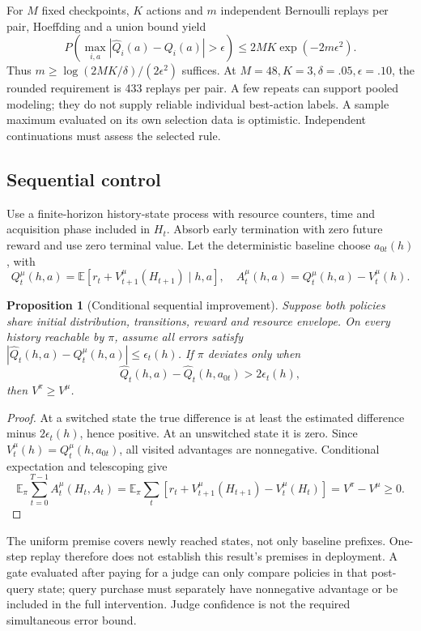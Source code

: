 \documentclass[11pt]{article}
\newtheorem{proposition}{Proposition}
\begin{document}
For $M$ fixed checkpoints, $K$ actions and $m$ independent Bernoulli replays per pair, Hoeffding and a union bound yield
\[
P\!\left(\max_{i,a}|\widehat Q_i(a)-Q_i(a)|>\epsilon\right)
\leq2MK\exp(-2m\epsilon^2).
\]
Thus $m\geq\log(2MK/\delta)/(2\epsilon^2)$ suffices. At $M=48,K=3,\delta=.05,\epsilon=.10$, the rounded requirement is 433 replays per pair. A few repeats can support pooled modeling; they do not supply reliable individual best-action labels. A sample maximum evaluated on its own selection data is optimistic. Independent continuations must assess the selected rule.

\subsection{Sequential control}
Use a finite-horizon history-state process with resource counters, time and acquisition phase included in $H_t$. Absorb early termination with zero future reward and use zero terminal value. Let the deterministic baseline choose $a_{0t}(h)$, with
\[
Q_t^\mu(h,a)=\mathbb E[r_t+V_{t+1}^\mu(H_{t+1})\mid h,a],\quad
A_t^\mu(h,a)=Q_t^\mu(h,a)-V_t^\mu(h).
\]
\begin{proposition}[Conditional sequential improvement]
Suppose both policies share initial distribution, transitions, reward and resource envelope. On every history reachable by $\pi$, assume all errors satisfy
$|\widehat Q_t(h,a)-Q_t^\mu(h,a)|\leq\epsilon_t(h)$.
If $\pi$ deviates only when
\[
\widehat Q_t(h,a)-\widehat Q_t(h,a_{0t})>2\epsilon_t(h),
\]
then $V^\pi\geq V^\mu$.
\end{proposition}
\begin{proof}
At a switched state the true difference is at least the estimated difference minus $2\epsilon_t(h)$, hence positive. At an unswitched state it is zero. Since $V_t^\mu(h)=Q_t^\mu(h,a_{0t})$, all visited advantages are nonnegative. Conditional expectation and telescoping give
\[
\mathbb E_\pi\sum_{t=0}^{T-1}A_t^\mu(H_t,A_t)
=\mathbb E_\pi\sum_t[r_t+V_{t+1}^\mu(H_{t+1})-V_t^\mu(H_t)]
=V^\pi-V^\mu\geq0.
\]
\end{proof}
The uniform premise covers newly reached states, not only baseline prefixes. One-step replay therefore does not establish this result's premises in deployment. A gate evaluated after paying for a judge can only compare policies in that post-query state; query purchase must separately have nonnegative advantage or be included in the full intervention. Judge confidence is not the required simultaneous error bound.
\end{document}
